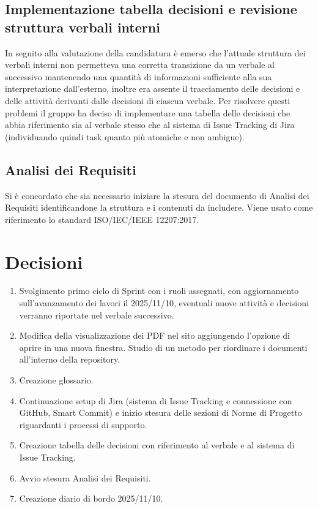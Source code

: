 \documentclass[a4paper,12pt]{article}
\begin{document}
\subsection{Implementazione tabella decisioni e revisione struttura verbali interni}
In seguito alla valutazione della candidatura è emerso che l'attuale struttura dei verbali interni non permetteva una corretta 
transizione da un verbale al successivo mantenendo una quantità di informazioni sufficiente alla sua interpretazione dall'esterno, 
inoltre era assente il tracciamento delle decisioni e delle attività derivanti dalle decisioni di ciascun verbale. Per risolvere 
questi problemi il gruppo ha deciso di implementare una tabella delle decisioni che abbia riferimento sia al verbale stesso che al 
sistema di Issue Tracking di Jira (individuando quindi task quanto più atomiche e non ambigue).

\subsection{Analisi dei Requisiti}
Si è concordato che sia necessario iniziare la stesura del documento di Analisi dei Requisiti identificandone la struttura e 
i contenuti da includere. Viene usato come riferimento lo standard ISO/IEC/IEEE 12207:2017.

\newpage


\section{Decisioni}
\begin{enumerate}[noitemsep]
    \item Svolgimento primo ciclo di Sprint con i ruoli assegnati, con aggiornamento sull'avanzamento dei lavori il 2025/11/10, 
    eventuali nuove attività e decisioni verranno riportate nel verbale successivo. 
    \item Modifica della visualizzazione dei PDF nel sito aggiungendo l'opzione di aprire in una nuova finestra. Studio di un 
    metodo per riordinare i documenti all'interno della repository.
    \item Creazione glossario.
    \item Continuazione setup di Jira (sistema di Issue Tracking e connessione con GitHub, Smart Commit) e inizio stesura delle 
    sezioni di Norme di Progetto riguardanti i processi di supporto. 
    \item Creazione tabella delle decisioni con riferimento al verbale e al sistema di Issue Tracking.
    \item Avvio stesura Analisi dei Requisiti.
    \item Creazione diario di bordo 2025/11/10.
\end{enumerate}
\end{document}
